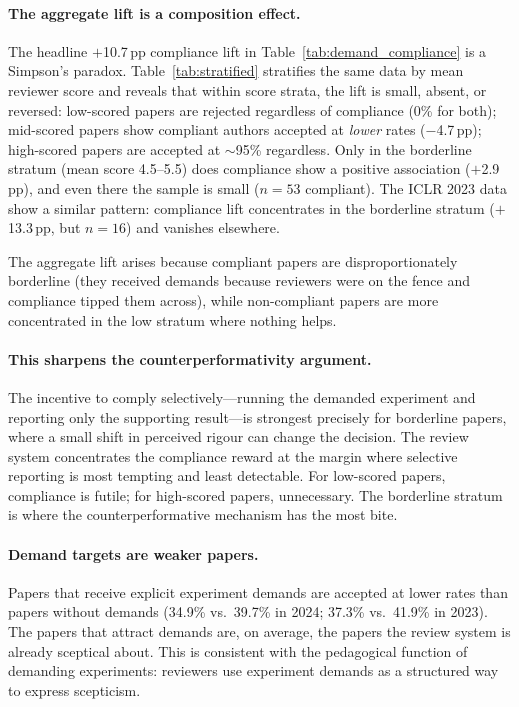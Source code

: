 \documentclass{article}
\begin{document}
\paragraph{The aggregate lift is a composition effect.} The headline $+$10.7\,pp compliance lift in Table~\ref{tab:demand_compliance} is a Simpson's paradox. Table~\ref{tab:stratified} stratifies the same data by mean reviewer score and reveals that within score strata, the lift is small, absent, or reversed: low-scored papers are rejected regardless of compliance (0\% for both); mid-scored papers show compliant authors accepted at \emph{lower} rates ($-$4.7\,pp); high-scored papers are accepted at $\sim$95\% regardless. Only in the borderline stratum (mean score 4.5--5.5) does compliance show a positive association ($+$2.9\,pp), and even there the sample is small ($n = 53$ compliant). The ICLR 2023 data show a similar pattern: compliance lift concentrates in the borderline stratum ($+$13.3\,pp, but $n = 16$) and vanishes elsewhere.

The aggregate lift arises because compliant papers are disproportionately borderline (they received demands because reviewers were on the fence and compliance tipped them across), while non-compliant papers are more concentrated in the low stratum where nothing helps.

\paragraph{This sharpens the counterperformativity argument.} The incentive to comply selectively---running the demanded experiment and reporting only the supporting result---is strongest precisely for borderline papers, where a small shift in perceived rigour can change the decision. The review system concentrates the compliance reward at the margin where selective reporting is most tempting and least detectable. For low-scored papers, compliance is futile; for high-scored papers, unnecessary. The borderline stratum is where the counterperformative mechanism has the most bite.

\paragraph{Demand targets are weaker papers.} Papers that receive explicit experiment demands are accepted at lower rates than papers without demands (34.9\% vs.\ 39.7\% in 2024; 37.3\% vs.\ 41.9\% in 2023). The papers that attract demands are, on average, the papers the review system is already sceptical about. This is consistent with the pedagogical function of demanding experiments: reviewers use experiment demands as a structured way to express scepticism.
\end{document}
